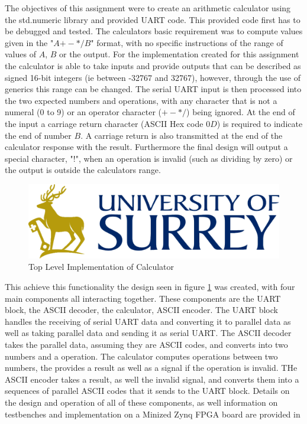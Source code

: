 \documentclass[11pt]{article}
\begin{document}
The objectives of this assignment were to create an arithmetic calculator using the std.numeric library and provided UART code.
This provided code first has to be debugged and tested.
The calculators basic requirement was to compute values given in the "$A {+-*/} B$" format, with no specific instructions of the range of values of $A$, $B$ or the output.
For the implementation created for this assignment the calculator is able to take inputs and provide outputs that can be described as signed 16-bit integers (ie between -32767 and 32767),
however, through the use of generics this range can be changed.
The serial UART input is then processed into the two expected numbers and operations, with any character that is not a numeral (0 to 9) or an operator character ($+-*/$) being ignored.
At the end of the input a carriage return character (ASCII Hex code $0D$) is required to indicate the end of number $B$.
A carriage return is also transmitted at the end of the calculator response with the result.
Furthermore the final design will output a special character, "!", when an operation is invalid (such as dividing by zero) or the output is outside the calculators range.

\begin{figure}[H]        
    \centering
    \includegraphics[width=\textwidth]{Logo.png}
    \caption{Top Level Implementation of Calculator}
    \label{fig:toplevel}
\end{figure} 

This achieve this functionality the design seen in figure \ref{fig:toplevel} was created, with four main components all interacting together.
These components are the UART block, the ASCII decoder, the calculator, ASCII encoder.
The UART block handles the receiving of serial UART data and converting it to parallel data as well as taking parallel data and sending it as serial UART.
The ASCII decoder takes the parallel data, assuming they are ASCII codes, and converts into two numbers and a operation.
The calculator computes operations between two numbers, the provides a result as well as a signal if the operation is invalid.
THe ASCII encoder takes a result, as well the invalid signal, and converts them into a sequences of parallel ASCII codes that it sends to the UART block.
Details on the design and operation of all of these components, as well information on testbenches and implementation on a Minized Zynq FPGA board are provided in
\end{document}
